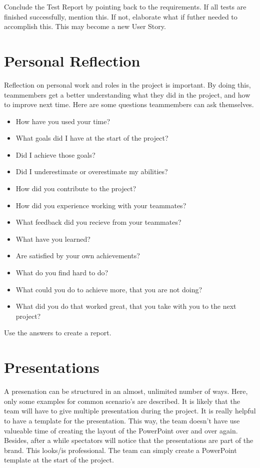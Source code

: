 \documentclass[10pt]{report}
\begin{document}
Conclude the Test Report by pointing back to the requirements. If all tests are finished successfully, mention this. If not, elaborate what if futher needed to accomplish this. This may become a new User Story.

\newpage

\section{Personal Reflection}

Reflection on personal work and roles in the project is important. By doing this, teammembers get a better understanding what they did in the project, and how to improve next time. Here are some questions teammembers can ask themselves. 

\begin{itemize}
	\item How have you used your time?
	\item What goals did I have at the start of the project?
	\item Did I achieve those goals?
	\item Did I underestimate or overestimate my abilities?
	\item How did you contribute to the project?
	\item How did you experience working with your teammates?
	\item What feedback did you recieve from your teammates?
	\item What have you learned?
	\item Are satisfied by your own achievements?
	\item What do you find hard to do?
	\item What could you do to achieve more, that you are not doing?
	\item What did you do that worked great, that you take with you to the next project?
\end{itemize}

\noindent Use the answers to create a report.

\newpage

\section{Presentations}

A presenation can be structured in an almost, unlimited number of ways. Here, only some examples for common scenario's are described. It is likely that the team will have to give multiple presentation during the project. It is really helpful to have a template for the presentation. This way, the team doesn't have use valueable time of creating the layout of the PowerPoint over and over again. Besides, after a while spectators will notice that the presentations are part of the brand. This looks/is professional. The team can simply create a PowerPoint template at the start of the project.
\end{document}
